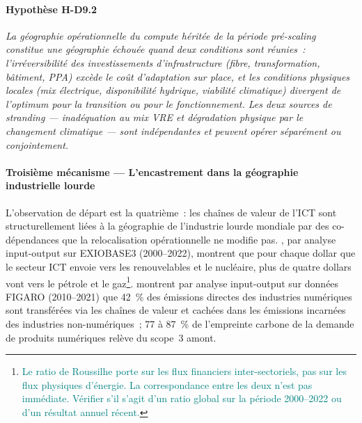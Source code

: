 \paragraph{Hypothèse H-D9.2} \emph{La géographie opérationnelle du compute héritée de la période pré-scaling constitue une géographie échouée quand deux conditions sont réunies~: l'irréversibilité des investissements d'infrastructure (fibre, transformation, bâtiment, PPA) excède le coût d'adaptation sur place, et les conditions physiques locales (mix électrique, disponibilité hydrique, viabilité climatique) divergent de l'optimum pour la transition ou pour le fonctionnement. Les deux sources de stranding --- inadéquation au mix VRE et dégradation physique par le changement climatique --- sont indépendantes et peuvent opérer séparément ou conjointement.}


\paragraph{Troisième mécanisme --- L'encastrement dans la géographie industrielle lourde}

\markEVO \markSTS
L'observation de départ est la quatrième~: les chaînes de valeur de l'ICT sont structurellement liées à la géographie de l'industrie lourde mondiale par des co-dépendances que la relocalisation opérationnelle ne modifie pas. \textcite{roussilhe_counting_2026}, par analyse input-output sur EXIOBASE3 (2000--2022), montrent que pour chaque dollar que le secteur ICT envoie vers les renouvelables et le nucléaire, plus de quatre dollars vont vers le pétrole et le gaz\footnote{\textcolor{teal}{Le ratio de Roussilhe porte sur les flux financiers inter-sectoriels, pas sur les flux physiques d'énergie. La correspondance entre les deux n'est pas immédiate. Vérifier s'il s'agit d'un ratio global sur la période 2000--2022 ou d'un résultat annuel récent.}}. \textcite{axenbeck_global_2025} montrent par analyse input-output sur données FIGARO (2010--2021) que 42~\% des émissions directes des industries numériques sont transférées via les chaînes de valeur et cachées dans les émissions incarnées des industries non-numériques~; 77 à 87~\% de l'empreinte carbone de la demande de produits numériques relève du scope~3 amont.

